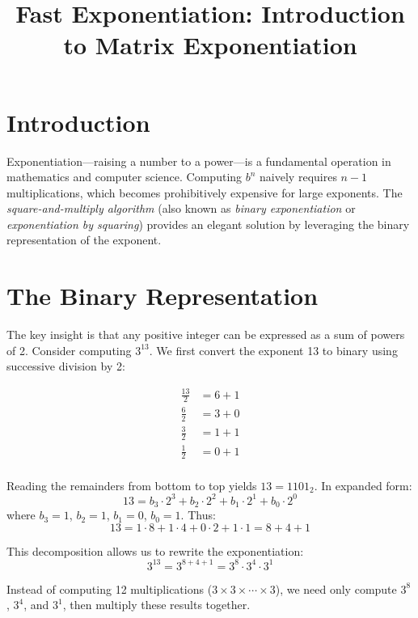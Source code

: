 \documentclass{article}
\begin{document}
	
	\title{Fast Exponentiation: Introduction to Matrix Exponentiation}
	\author{}
	\date{}
	\maketitle
	
	\tableofcontents
	
	\section{Introduction}
	
	Exponentiation---raising a number to a power---is a fundamental operation in mathematics and computer science. Computing $b^n$ naively requires $n-1$ multiplications, which becomes prohibitively expensive for large exponents. The \emph{square-and-multiply algorithm} (also known as \emph{binary exponentiation} or \emph{exponentiation by squaring}) provides an elegant solution by leveraging the binary representation of the exponent.
	
	\section{The Binary Representation}
	
	The key insight is that any positive integer can be expressed as a sum of powers of 2. Consider computing $3^{13}$. We first convert the exponent 13 to binary using successive division by 2:
	
    \begin{align*}
		\frac{13}{2} &= 6 + 1 \\
		\frac{6}{2} &= 3 + 0 \\
		\frac{3}{2} &= 1 + 1 \\
		\frac{1}{2} &= 0 + 1 \\
	\end{align*}
	
	Reading the remainders from bottom to top yields $13 = 1101_2$. In expanded form:
	\[
	13 = b_3 \cdot 2^3 + b_2 \cdot 2^2 + b_1 \cdot 2^1 + b_0 \cdot 2^0
	\]
	where $b_3 = 1$, $b_2 = 1$, $b_1 = 0$, $b_0 = 1$. Thus:
	\[
	13 = 1 \cdot 8 + 1 \cdot 4 + 0 \cdot 2 + 1 \cdot 1 = 8 + 4 + 1
	\]
	
	This decomposition allows us to rewrite the exponentiation:
	\[
	3^{13} = 3^{8+4+1} = 3^8 \cdot 3^4 \cdot 3^1
	\]
	
	Instead of computing 12 multiplications ($3 \times 3 \times \cdots \times 3$), we need only compute $3^8$, $3^4$, and $3^1$, then multiply these results together.
	
\end{document}

